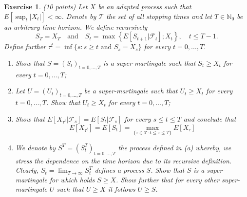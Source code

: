 \documentclass[DIV=classic,a4paper,10pt]{scrartcl}
\newtheorem{exercise}[theorem]{Exercise}
\theoremstyle{nonumberplain}
\numberwithin{equation}{section}
\begin{document}
\begin{exercise}(10 points)
    Let $X$ be an adapted process such that $E[\sup_t |X_t|]<\infty$.
    Denote by $\mathcal{T}$ the set of all stopping times and let $T \in \mathbb{N}_0$ be an arbitrary time horizon.
    We define recursively
    \begin{equation*}
        S_T=X_T\quad \text{and}\quad S_t=\max \left\{ E\left[ S_{t+1}|\mathcal{F}_t \right];X_t \right\}, \quad t\leq T-1.
    \end{equation*}
    Define further $\tau^t=\inf\{s\colon s\geq t \text{ and }S_s=X_s\}$ for every $t=0,\ldots, T$.
    \begin{enumerate}[label=(\alph*)]
        \item Show that $S=(S_t)_{t=0,\ldots, T}$ is a super-martingale such that $S_t\geq X_t$ for every $t=0,\ldots, T$;
        \item Let $U=(U_t)_{t=0,\ldots,T}$ be a super-martingale such that $U_t\geq X_t$ for every $t=0,\ldots,T$.
            Show that $U_t\geq X_t$ for every $t=0,\ldots, T$;
        \item Show that $E[X_{\tau^t}|\mathcal{F}_s]=E[S_t|\mathcal{F}_s]$ for every $s\leq t\leq T$ and conclude that
            \begin{equation*}
                E\left[ X_{\tau^t} \right]=E\left[ S_t \right]=\max_{\{\tau \in \mathcal{T}\colon t\leq \tau\leq T\}} E\left[ X_\tau \right]
            \end{equation*}
        \item We denote by $S^T=(S_t^T)_{t=0,\ldots, T}$ the process defined in (a) whereby, we stress the dependence on the time horizon due to its recursive definition.
            Clearly, $S_t=\lim_{T\to \infty} S^T_t$ defines a process $S$.
            Show that $S$ is a super-martingale for which holds $S\geq X$.
            Show further that for every other super-martingale $U$ such that $U\geq X$ it follows $U\geq S$.
    \end{enumerate}
\end{exercise}
\end{document}
